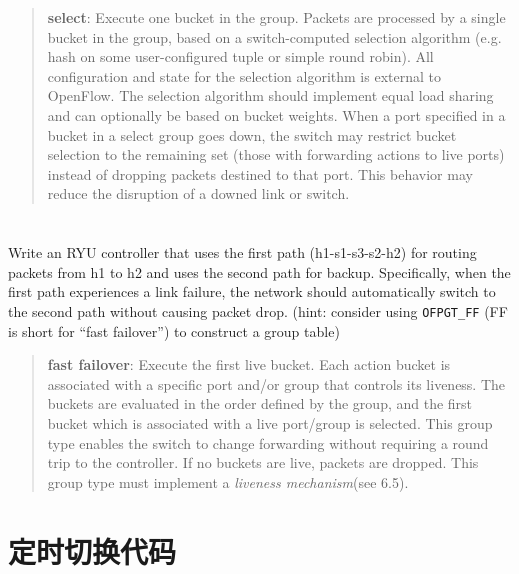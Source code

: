 \begin{quotation}
    \textbf{select}: Execute one bucket in the group. Packets are processed by a single bucket in the
group, based on a switch-computed selection algorithm (e.g. hash on some user-configured tuple or
simple round robin). All configuration and state for the selection algorithm is external to OpenFlow.
The selection algorithm should implement equal load sharing and can optionally be based on bucket
weights. When a port specified in a bucket in a select group goes down, the switch may restrict bucket
selection to the remaining set (those with forwarding actions to live ports) instead of dropping packets
destined to that port. This behavior may reduce the disruption of a downed link or switch.\cite{openflow13}
\end{quotation}

    \section{}
    Write an RYU controller that uses the first path (h1-s1-s3-s2-h2) for routing packets from h1 to h2 and uses the second path for backup. Specifically, when the first path experiences a link failure, the network should automatically switch to the second path without causing packet drop. (hint: consider using \verb"OFPGT_FF" (FF is short for ``fast failover'') to construct a group table)

    \begin{quotation}
        \textbf{fast failover}: Execute the first live bucket. Each action bucket is associated with a specific
port and/or group that controls its liveness. The buckets are evaluated in the order defined by the
group, and the first bucket which is associated with a live port/group is selected. This group type
enables the switch to change forwarding without requiring a round trip to the controller. If no buckets
are live, packets are dropped. This group type must implement a \emph{liveness mechanism}(see 6.5).\cite{openflow13}
    \end{quotation}

    

    \appendix

    \section{定时切换代码}\label{sec:per5}


